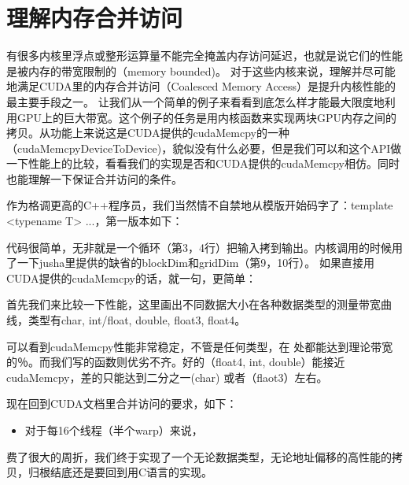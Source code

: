 \chapter{理解内存合并访问}

有很多内核里浮点或整形运算量不能完全掩盖内存访问延迟，也就是说它们的性能是被内存的带宽限制的（memory bounded)。 对于这些内核来说，理解并尽可能地满足CUDA里的内存合并访问（Coalesced Memory Access）是提升内核性能的最主要手段之一。 让我们从一个简单的例子来看看到底怎么样才能最大限度地利用GPU上的巨大带宽。这个例子的任务是用内核函数来实现两块GPU内存之间的拷贝。从功能上来说这是CUDA提供的cudaMemcpy的一种（cudaMemcpyDeviceToDevice)，貌似没有什么必要，但是我们可以和这个API做一下性能上的比较，看看我们的实现是否和CUDA提供的cudaMemcpy相仿。同时也能理解一下保证合并访问的条件。

作为格调更高的C++程序员，我们当然情不自禁地从模版开始码字了：template <typename T> ...，第一版本如下：
\myvspace

代码很简单，无非就是一个循环（第3，4行）把输入拷到输出。内核调用的时候用了一下jusha里提供的缺省的blockDim和gridDim（第9，10行）。
如果直接用CUDA提供的cudaMemcpy的话，就一句，更简单：
\myvspace


首先我们来比较一下性能，这里画出不同数据大小在各种数据类型的测量带宽曲线，类型有char, int/float, double, float3, float4。

可以看到cudaMemcpy性能非常稳定，不管是任何类型，在  处都能达到理论带宽的％。而我们写的函数则优劣不齐。好的（float4, int, double）能接近cudaMemcpy，差的只能达到二分之一(char) 或者（flaot3）左右。

现在回到CUDA文档里合并访问的要求，如下：
\begin{itemize}
\item 对于每16个线程（半个warp）来说，
\end{itemize}

费了很大的周折，我们终于实现了一个无论数据类型，无论地址偏移的高性能的拷贝，归根结底还是要回到用C语言的实现。